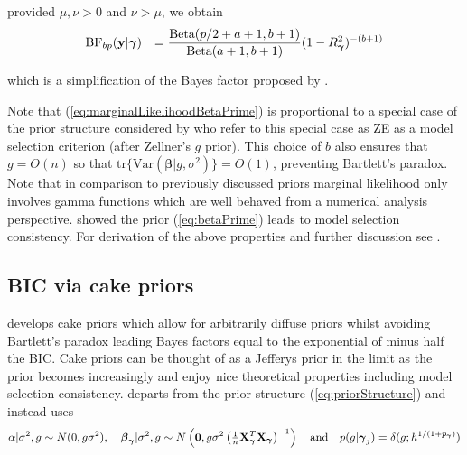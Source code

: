 \documentclass[12pt]{article}
\def\vectorfontone{\bf}
\def\vectorfonttwo{\boldsymbol}
\def\vy{{\vectorfontone y}}                      %
\def\vzero{{\vectorfontone 0}}
\def\vbeta{{\vectorfonttwo \beta}}               %
\def\vgamma{{\vectorfonttwo \gamma}}             %
\def\matrixfontone{\bf}
\def\mX{{\matrixfontone X}}                      %
\def\ds{\displaystyle}
\begin{document}
\noindent provided $\mu,\nu>0$ and $\nu>\mu$, we obtain
\begin{equation}\label{eq:marginalLikelihoodBetaPrime}
\begin{array}{rl}
\ds \mbox{BF}_{bp}(\vy|\vgamma) 
& \ds 
=   
\frac{\mbox{Beta}(p/2 + a + 1,b + 1)}{\mbox{Beta}(a+1,b+1)} (1-R_\vgamma^2)^{-(b + 1)}
%
\end{array}
\end{equation}

\noindent which is a simplification of the Bayes factor proposed by
\cite{Maruyama2011}.


Note that (\ref{eq:marginalLikelihoodBetaPrime}) is proportional
to a special case of the prior structure considered by \cite{Maruyama2011}
who refer to this special case as ZE as a model selection criterion (after Zellner's $g$ prior). This choice of $b$ also ensures that $g = O(n)$ so that $\mbox{tr}\{\mbox{Var}(\vbeta | g, \sigma^2)\} = O(1)$, preventing Bartlett's paradox. 
Note that in comparison to previously discussed priors
marginal likelihood only involves gamma functions which
are well behaved from a numerical analysis perspective. 
\cite{Maruyama2011} showed the prior (\ref{eq:betaPrime}) leads to model
selection consistency.
For derivation of the above properties and further discussion see \cite{Maruyama2011}.




\subsection{BIC via cake priors}  

\cite{OrmerodEtal2017} develops cake priors which allow for arbitrarily diffuse priors
whilst avoiding Bartlett's paradox leading Bayes factors equal to the exponential of minus half
the BIC. Cake priors
can be thought of as a Jefferys prior in the limit
as the prior becomes increasingly
and enjoy nice theoretical properties including model
selection consistency. \cite{OrmerodEtal2017} 
departs from the prior structure (\ref{eq:priorStructure}) and instead uses
\begin{equation}\label{eq:proirs2}
\ds \alpha|\sigma^2,g \sim N(0,g\sigma^2), \quad 
\ds \vbeta_\vgamma|\sigma^2,g \sim N\left( \vzero,g\sigma^2\left( \tfrac{1}{n}\mX_\vgamma^T\mX_\vgamma\right)^{-1}\right)
\quad \mbox{and} \quad
p(g|\vgamma_j) = \delta(g; h^{1/(1 + p_\vgamma)})
\end{equation}
\end{document}
